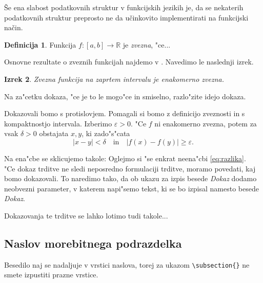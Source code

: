 \documentclass[12pt,a4paper]{amsart}
\theoremstyle{definition} %
\newtheorem{definicija}{Definicija}[section]
\theoremstyle{plain} %
\newtheorem{izrek}[definicija]{Izrek}
\newcommand{\R}{\mathbb R}
\begin{document}
Še ena slabost podatkovnih struktur v funkcijskih jezikih je, da se nekaterih podatkovnih struktur preprosto ne da učinkovito implementirati na funkcijski način.






















\begin{definicija}
Funkcija $f\colon [a,b]\to\R$ je {\em zvezna}, "ce...
\end{definicija}

Osnovne rezultate o zveznih funkcijah najdemo v \cite{glob}. Navedimo le naslednji izrek.

\begin{izrek}\label{izr:enakomerno}
Zvezna funkcija na zaprtem intervalu je enakomerno zvezna.
\end{izrek}

\proof
Na za"cetku dokaza, "ce je to le mogo"ce in smiselno, razlo"zite idejo dokaza. 

Dokazovali bomo s protislovjem. Pomagali si bomo z definicijo zveznosti in s kompaktnostjo intervala.
Izberimo $\varepsilon>0$. "Ce $f$ ni enakomerno zvezna, potem za vsak $\delta>0$ obstajata $x, y$, ki zado"s"cata
\begin{equation}\label{eq:razlika}
|x-y|<\delta\quad \text{in}\quad |f(x)-f(y)| \ge \varepsilon.
\end{equation}
\endproof

Na ena"cbe se sklicujemo takole: Oglejmo si "se enkrat neena"cbi \eqref{eq:razlika}.\\

"Ce dokaz trditve ne sledi neposredno formulaciji trditve, moramo povedati, kaj bomo dokazovali. To naredimo tako, da ob ukazu za izpis besede \emph{Dokaz} dodamo neobvezni parameter, v katerem napi"semo tekst, ki se bo izpisal namesto besede \emph{Dokaz}.

Dokazovanja te trditve se lahko lotimo tudi takole...
\endproof

\subsection{Naslov morebitnega podrazdelka} Besedilo naj se nadaljuje v vrstici naslova, torej za ukazom \verb|\subsection{}| ne smete izpustiti prazne vrstice.
\end{document}

